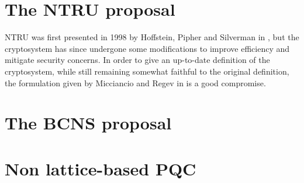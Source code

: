 \section{The NTRU proposal}
NTRU was first presented in 1998 by Hoffstein, Pipher and Silverman in \cite{NTRU}, but the cryptosystem has since undergone some modifications to improve efficiency and mitigate security concerns. In order to give an up-to-date definition of the cryptosystem, while still remaining somewhat faithful to the original definition, the formulation given by Micciancio and Regev in \cite{PQC} is a good compromise.\\


\section{The BCNS proposal}

\section{Non lattice-based PQC}
